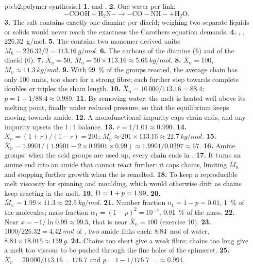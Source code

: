 \begin{solution}{pb:b2:polymer-synthesis:1}
\textbf{1.}  and .
\textbf{2.} One water per link:
\[\mathrm{{-}COOH + H_2N{-} \longrightarrow {-}CO{-}NH{-} + H_2O}.\]
\textbf{3.} The salt contains exactly one diamine per diacid; weighing two separate liquids or solids
would never reach the exactness the Carothers equation demands.
\textbf{4.} \ce{-[NH(CH2)6NH-CO(CH2)4CO]-}, , \qty{226.32}{g/mol}.
\textbf{5.} The  contains two monomer-derived units: $M_0 = 226.32/2 = \qty{113.16}{g/mol}$.
\textbf{6.} The carbons of the diamine (6) and of the diacid (6).
\textbf{7.} $\bar X_n = 50$, $\bar M_n = 50 \times 113.16 \approx \qty{5.66}{kg/mol}$.
\textbf{8.} $\bar X_n = 100$, $\bar M_n \approx \qty{11.3}{kg/mol}$.
\textbf{9.} With 99~\% of the groups reacted, the average chain has only 100 units, too short for a
strong fibre; each further step towards complete  doubles or triples the chain length.
\textbf{10.} $\bar X_n = 10\,000/113.16 = 88.4$; $p = 1 - 1/88.4 \approx 0.989$.
\textbf{11.} By removing water: the melt is heated well above its melting point, finally under reduced
pressure, so that the equilibrium keeps moving towards amide.
\textbf{12.} A monofunctional impurity caps chain ends, and any impurity upsets the 1\,:\,1 balance.
\textbf{13.} $r = 1/1.01 \approx 0.990$.
\textbf{14.} $\bar X_n = (1+r)/(1-r) = 201$; $\bar M_n \approx 201 \times 113.16 \approx
\qty{22.7}{kg/mol}$.
\textbf{15.} $\bar X_n = 1.9901/(1.9901 - 2 \times 0.9901 \times 0.99) \approx 1.9901/0.0297 \approx
67$.
\textbf{16.} Amine groups: when the acid groups are used up, every chain ends in .
\textbf{17.} It turns an amine end into an amide that cannot react further: it caps chains, limiting
$\bar M_n$ and stopping further growth when the  is remelted.
\textbf{18.} To keep a reproducible melt viscosity for spinning and moulding, which would otherwise
drift as chains keep reacting in the melt.
\textbf{19.} $\text{\DH} = 1 + p = 1.99$.
\textbf{20.} $\bar M_w = 1.99 \times 11.3 \approx \qty{22.5}{kg/mol}$.
\textbf{21.} Number fraction $n_1 = 1 - p = 0.01$, 1~\% of the molecules; mass fraction $w_1 = (1-p)^2 =
10^{-4}$, 0.01~\% of the mass.
\textbf{22.} Near $x = -1/\ln 0.99 \approx 99.5$, that is near $\bar X_n = 100$ (exercise 10).
\textbf{23.} $1000/226.32 = \qty{4.42}{mol}$ of , two amide links each: \qty{8.84}{mol} of
water, $8.84 \times 18.015 \approx \qty{159}{g}$.
\textbf{24.} Chains too short give a weak fibre; chains too long give a melt too viscous to be pushed
through the fine holes of the spinneret.
\textbf{25.} $\bar X_n = 20\,000/113.16 = 176.7$ and $p = 1 - 1/176.7 = \boldsymbol{\approx 0.994}$.
\end{solution}
